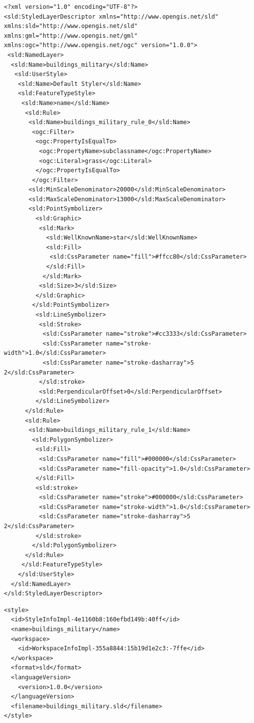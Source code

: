 \lstset{language=java}
\begin{lstlisting}[frame=htrbl, caption={Beispiel für SLD}, label={lst:SLD}]
<?xml version="1.0" encoding="UTF-8"?>
<sld:StyledLayerDescriptor xmlns="http://www.opengis.net/sld" xmlns:sld="http://www.opengis.net/sld" xmlns:gml="http://www.opengis.net/gml" xmlns:ogc="http://www.opengis.net/ogc" version="1.0.0">
 <sld:NamedLayer>
  <sld:Name>buildings_military</sld:Name>
   <sld:UserStyle>
    <sld:Name>Default Styler</sld:Name>
    <sld:FeatureTypeStyle>
     <sld:Name>name</sld:Name>
      <sld:Rule>
       <sld:Name>buildings_military_rule_0</sld:Name>
        <ogc:Filter>
         <ogc:PropertyIsEqualTo>
          <ogc:PropertyName>subclassname</ogc:PropertyName>
          <ogc:Literal>grass</ogc:Literal>
         </ogc:PropertyIsEqualTo>
        </ogc:Filter>
       <sld:MinScaleDenominator>20000</sld:MinScaleDenominator>
       <sld:MaxScaleDenominator>13000</sld:MaxScaleDenominator>
       <sld:PointSymbolizer>
         <sld:Graphic>
          <sld:Mark>
            <sld:WellKnownName>star</sld:WellKnownName>
            <sld:Fill>
             <sld:CssParameter name="fill">#ffcc80</sld:CssParameter>
            </sld:Fill>
           </sld:Mark>
          <sld:Size>3</sld:Size>
         </sld:Graphic>
        </sld:PointSymbolizer>
         <sld:LineSymbolizer>
          <sld:Stroke>
           <sld:CssParameter name="stroke">#cc3333</sld:CssParameter>
           <sld:CssParameter name="stroke-width">1.0</sld:CssParameter>
           <sld:CssParameter name="stroke-dasharray">5 2</sld:CssParameter>
          </sld:stroke>
          <sld:PerpendicularOffset>0</sld:PerpendicularOffset>
         </sld:LineSymbolizer>
      </sld:Rule>
      <sld:Rule>
       <sld:Name>buildings_military_rule_1</sld:Name>
        <sld:PolygonSymbolizer>
         <sld:Fill>
          <sld:CssParameter name="fill">#000000</sld:CssParameter>
          <sld:CssParameter name="fill-opacity">1.0</sld:CssParameter>
         </sld:Fill>
         <sld:stroke>
          <sld:CssParameter name="stroke">#000000</sld:CssParameter>
          <sld:CssParameter name="stroke-width">1.0</sld:CssParameter>
          <sld:CssParameter name="stroke-dasharray">5 2</sld:CssParameter>
         </sld:stroke>
        </sld:PolygonSymbolizer>
      </sld:Rule>
     </sld:FeatureTypeStyle>
    </sld:UserStyle>
  </sld:NamedLayer>
</sld:StyledLayerDescriptor>
\end{lstlisting}

\lstset{language=java}
\begin{lstlisting}[frame=htrbl, caption={Beispiel XML-Datei für Geoserver}, label={lst:XML_SLD}]
<style>
  <id>StyleInfoImpl-4e1160b8:160efbd149b:40ff</id>
  <name>buildings_military</name>
  <workspace>
    <id>WorkspaceInfoImpl-355a8844:15b19d1e2c3:-7ffe</id>
  </workspace>
  <format>sld</format>
  <languageVersion>
    <version>1.0.0</version>
  </languageVersion>
  <filename>buildings_military.sld</filename>
</style>
\end{lstlisting}

